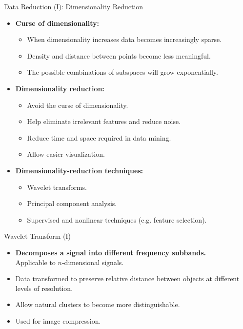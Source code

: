 \begin{frame}{Data Reduction (I): Dimensionality Reduction}
	\begin{itemize}
		\item \textbf{Curse of dimensionality:}
		      \begin{itemize}
			      \item When dimensionality increases data becomes increasingly
			            sparse.
			      \item Density and distance between points become less meaningful.
			      \item The possible combinations of subspaces will grow
			            exponentially.
		      \end{itemize}
		\item \textbf{Dimensionality reduction:}
		      \begin{itemize}
			      \item Avoid the curse of dimensionality.
			      \item Help eliminate irrelevant features and reduce noise.
			      \item Reduce time and space required in data mining.
			      \item Allow easier visualization.
		      \end{itemize}
		\item \textbf{Dimensionality-reduction techniques:}
		      \begin{itemize}
			      \item Wavelet transforms.
			      \item Principal component analysis.
			      \item Supervised and nonlinear techniques (e.g. feature selection).
		      \end{itemize}
	\end{itemize}
\end{frame}

\begin{frame}{Wavelet Transform (I)}
	\begin{minipage}[t]{0.55\textwidth}
		\begin{itemize}
			\item \textbf{Decomposes a signal into different frequency
				      subbands.}\\
			      Applicable to $n$-dimensional signals.
			\item Data transformed to preserve relative distance between
			      objects at different levels of resolution.
			\item Allow natural clusters to become more distinguishable.
			\item Used for image compression.
		\end{itemize}
	\end{minipage}\hspace{1cm}
	\begin{minipage}[t]{0.30\textwidth}
	\end{minipage}
\end{frame}

